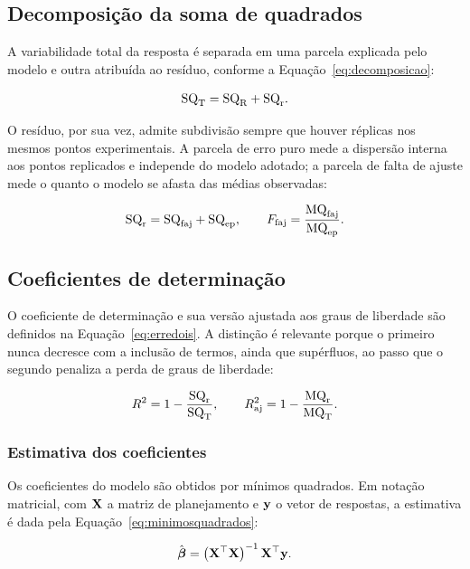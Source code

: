 \subsection{Decomposição da soma de quadrados}

A variabilidade total da resposta é separada em uma parcela explicada pelo
modelo e outra atribuída ao resíduo, conforme a
Equação~\eqref{eq:decomposicao}:

\begin{equation}
  \mathrm{SQ}_{\mathrm{T}} = \mathrm{SQ}_{\mathrm{R}} + \mathrm{SQ}_{\mathrm{r}} .
  \label{eq:decomposicao}
\end{equation}

O resíduo, por sua vez, admite subdivisão sempre que houver réplicas nos
mesmos pontos experimentais. A parcela de erro puro mede a dispersão interna
aos pontos replicados e independe do modelo adotado; a parcela de falta de
ajuste mede o quanto o modelo se afasta das médias observadas:

\begin{equation}
  \mathrm{SQ}_{\mathrm{r}} = \mathrm{SQ}_{\mathrm{faj}} + \mathrm{SQ}_{\mathrm{ep}} ,
  \qquad
  F_{\mathrm{faj}} = \frac{\mathrm{MQ}_{\mathrm{faj}}}{\mathrm{MQ}_{\mathrm{ep}}} .
  \label{eq:faltadeajuste}
\end{equation}

\subsection{Coeficientes de determinação}

O coeficiente de determinação e sua versão ajustada aos graus de liberdade são
definidos na Equação~\eqref{eq:erredois}. A distinção é relevante porque o
primeiro nunca decresce com a inclusão de termos, ainda que supérfluos, ao
passo que o segundo penaliza a perda de graus de liberdade:

\begin{equation}
  R^{2} = 1 - \frac{\mathrm{SQ}_{\mathrm{r}}}{\mathrm{SQ}_{\mathrm{T}}} ,
  \qquad
  R^{2}_{\mathrm{aj}} = 1 - \frac{\mathrm{MQ}_{\mathrm{r}}}{\mathrm{MQ}_{\mathrm{T}}} .
  \label{eq:erredois}
\end{equation}

\subsubsection{Estimativa dos coeficientes}

Os coeficientes do modelo são obtidos por mínimos quadrados. Em notação
matricial, com $\mathbf{X}$ a matriz de planejamento e $\mathbf{y}$ o vetor de respostas,
a estimativa é dada pela Equação~\eqref{eq:minimosquadrados}:

\begin{equation}
  \hat{\boldsymbol{\beta}} = \left( \mathbf{X}^{\top} \mathbf{X} \right)^{-1} \mathbf{X}^{\top} \mathbf{y} .
  \label{eq:minimosquadrados}
\end{equation}

